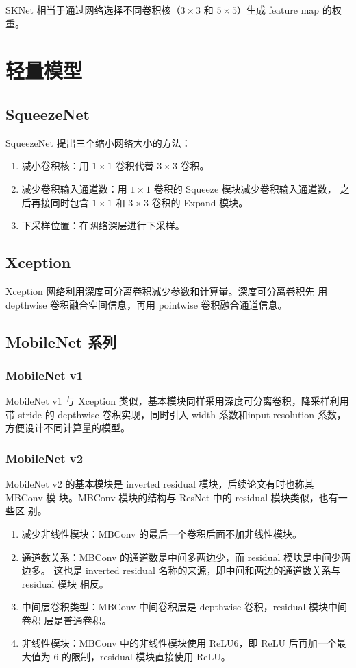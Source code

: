 SKNet 相当于通过网络选择不同卷积核（$3 \times 3$ 和 $5 \times 5$）生成 feature
map 的权重。

\chapter{轻量模型}
\section{SqueezeNet}
SqueezeNet\cite{2016-SqueezeNet} 提出三个缩小网络大小的方法：
\begin{enumerate}
  \item 减小卷积核：用 $1 \times 1$ 卷积代替 $3 \times 3$ 卷积。
  \item 减少卷积输入通道数：用 $1 \times 1$ 卷积的 Squeeze 模块减少卷积输入通道数，
    之后再接同时包含 $1 \times 1$ 和 $3 \times 3$ 卷积的 Expand 模块。
  \item 下采样位置：在网络深层进行下采样。
\end{enumerate}

\section{Xception}
Xception\cite{2016-Xception}
网络利用\hyperref[subsec:DSC]{深度可分离卷积}减少参数和计算量。深度可分离卷积先
用 depthwise 卷积融合空间信息，再用 pointwise 卷积融合通道信息。

\section{MobileNet 系列}
\subsection{MobileNet v1}
MobileNet v1 与 Xception 类似，基本模块同样采用深度可分离卷积，降采样利用
带 stride 的 depthwise 卷积实现，同时引入 width 系数和input resolution 系数，
方便设计不同计算量的模型。

\subsection{MobileNet v2}\label{subsec:MobileNet-v2}
MobileNet v2 的基本模块是 inverted residual 模块，后续论文有时也称其 MBConv 模
块。MBConv 模块的结构与 ResNet 中的 residual 模块类似，也有一些区
别。

\begin{enumerate}
  \item 减少非线性模块：MBConv 的最后一个卷积后面不加非线性模块。
  \item 通道数关系：MBConv 的通道数是中间多两边少，而 residual 模块是中间少两边多。
    这也是 inverted residual 名称的来源，即中间和两边的通道数关系与 residual 模块
    相反。
  \item 中间层卷积类型：MBConv 中间卷积层是 depthwise 卷积，residual 模块中间卷积
    层是普通卷积。
  \item 非线性模块：MBConv 中的非线性模块使用 ReLU6，即 ReLU 后再加一个最大值为
    6 的限制，residual 模块直接使用 ReLU。
\end{enumerate}

